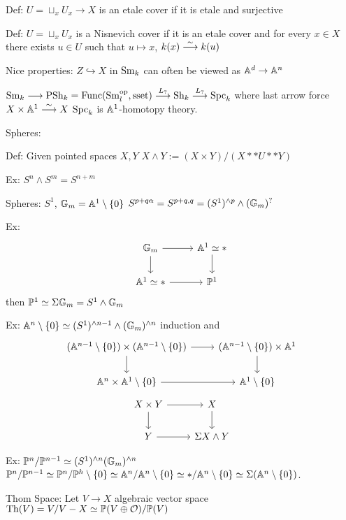 Def: $U= \sqcup_x U_x \to X$ is an etale cover if it is etale and surjective

Def: $U= \sqcup_x U_x$ is a Nisnevich cover if it is an etale cover and for every $x \in X$ there exists $u \in U$ such that $u \mapsto x$, $k(x) \stackrel{\sim}{\longrightarrow} k(u)$


Nice properties: $Z \hookrightarrow X$ in $\operatorname{Sm}_k$ can often be viewed as $\mathbb{A}^d \to \mathbb{A}^n$



$\operatorname{Sm}_k \stackrel{}{\longrightarrow} \operatorname{PSh}_k= \operatorname{Func}(\operatorname{Sm}_l^\text{op}, \text{sset}) \stackrel{L_?}{\longrightarrow} \operatorname{Sh}_k \stackrel{L_?}{\longrightarrow} \operatorname{Spc}_k$
where last arrow force $X \times \mathbb{A}^1 \stackrel{\sim}{\longrightarrow} X$
$\operatorname{Spc}_k$ is $\mathbb{A}^1$-homotopy theory. 



Spheres:

Def: Given pointed spaces $X,Y$ $X \wedge Y:= (X \times Y)/(X ** U ** Y)$

Ex: $S^n \wedge S^m= S^{n+m}$

Spheres: $S^1$, $\mathbb{G}_m= \mathbb{A}^1 \setminus \{0\}$
$S^{p+q\alpha}= S^{p+q,q}= (S^1)^{\wedge p} \wedge (\mathbb{G}_m)^?$

Ex:
	\[
	\begin{tikzcd}
	\G_m \arrow{r} \arrow{d} & \A^1 \simeq * \arrow{d} \\
	\A^1 \simeq * \arrow{r} & \P^1
	\end{tikzcd}
	\]
then $\mathbb{P}^1 \simeq \Sigma \mathbb{G}_m = S^1 \wedge \mathbb{G}_m$


Ex: $\mathbb{A}^n \setminus \{0\} \simeq (S^1)^{\wedge n-1} \wedge (\mathbb{G}_m)^{\wedge n}$
induction and 
	\[
	\begin{tikzcd}
	(\A^{n-1} \setminus \{0\}) \times (\A^{n-1} \setminus \{0\}) \arrow{r} \arrow{d} & (\A^{n-1} \setminus \{0\}) \times \A^1 \arrow{d} \\ 
	\A^n \times \A^1 \setminus \{0\} \arrow{r} &  \A^1 \setminus \{0\}
	\end{tikzcd}
	\]
	\[
	\begin{tikzcd}
	X \times Y \arrow{r} \arrow{d} & X \arrow{d} \\ 
	Y \arrow{r} &  \Sigma X \wedge Y
	\end{tikzcd}
	\]


Ex: $\mathbb{P}^n/\mathbb{P}^{n-1} \simeq (S^1)^{\wedge n} (\mathbb{G}_m)^{\wedge n}$
$\mathbb{P}^n/\mathbb{P}^{n-1} \simeq \mathbb{P}^n/\mathbb{P}^h \setminus \{0\} \simeq \mathbb{A}^n/\mathbb{A}^n \setminus \{0\} \simeq */\mathbb{A}^n \setminus \{0\} \simeq \Sigma (\mathbb{A}^n \setminus \{0\})$.


Thom Space: Let $V \to X$ algebraic vector space
$\text{Th}(V)= V/V-X \simeq \mathbb{P}(V\oplus \mathcal{O})/\mathbb{P}(V)$


